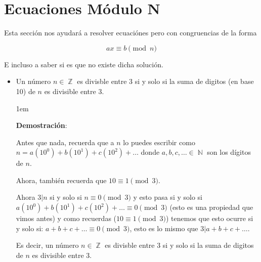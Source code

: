 \documentclass[12pt]{report}                                    %
\newenvironment{SmallIndentation}[1][0.75em]                    %
    {\begin{adjustwidth}{#1}{}\begin{footnotesize}}                 %
    {\end{footnotesize}\end{adjustwidth}}                           %
\DeclareMathOperator \Naturals  {\mathbb{N}}                     %
\DeclareMathOperator \Integers  {\mathbb{Z}}                     %
\begin{document}
    \clearpage
    \section{Ecuaciones Módulo N}

        Esta sección nos ayudará a resolver ecuaciónes pero con
        congruencias de la forma

        \begin{equation}
            ax \equiv b \pmod{n}
        \end{equation}

        E incluso a saber si es que no existe dicha solución.

        \begin{itemize}

            \item Un número $n \in \Integers$ es divisble entre 3 si y solo si
                la suma de digitos (en base 10) de $n$ es divisible entre 3.

                \begin{SmallIndentation}[1em]
                    \textbf{Demostración}:

                    Antes que nada, recuerda que a $n$ lo puedes escribir como
                    $n = a(10^0) + b(10^1) + c(10^2) + \dots$ donde
                    $a, b, c, \dots \in \Naturals$ son los dígitos de $n$.

                    Ahora, también recuerda que $10 \equiv 1 \pmod{3}$.

                    Ahora $3|n$ si y solo si $n \equiv 0 \pmod{3}$ y esto pasa si
                    y solo si $a(10^0) + b(10^1) + c(10^2) + \dots \equiv 0 \pmod{3}$
                    (esto es una propiedad que vimos antes) y como recuerdas
                    ($10 \equiv 1 \pmod{3}$) tenemos que esto ocurre si y solo si:
                    $a + b + c + \dots \equiv 0 \pmod{3}$, esto es lo mismo que
                    $3|a+b+c+\dots$.

                    Es decir, un número $n \in \Integers$ es divisble entre 3 si y solo si
                    la suma de digitos de $n$ es divisible entre 3.

                \end{SmallIndentation}

        \end{itemize}
\end{document}

